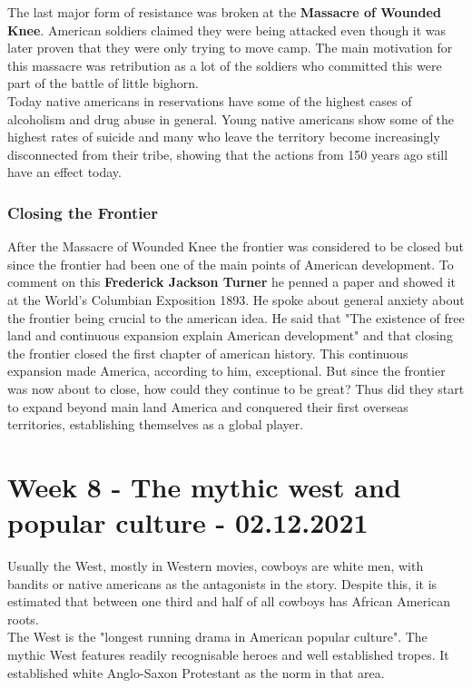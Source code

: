 \documentclass{article}
\begin{document}
	The last major form of resistance was broken at the \textbf{Massacre of Wounded Knee}. American soldiers claimed they were being attacked even though it was later proven that they were only trying to move camp. The main motivation for this massacre was retribution as a lot of the soldiers who committed this were part of the battle of little bighorn. \\
	Today native americans in reservations have some of the highest cases of alcoholism and drug abuse in general. Young native americans show some of the highest rates of suicide and many who leave the territory become increasingly disconnected from their tribe, showing that the actions from 150 years ago still have an effect today. \\
	\subsubsection{Closing the Frontier}
	After the Massacre of Wounded Knee the frontier was considered to be closed but since the frontier had been one of the main points of American development. To comment on this \textbf{Frederick Jackson Turner} he penned a paper and showed it at the World's Columbian Exposition 1893. He spoke about general anxiety about the frontier being crucial to the american idea. He said that "The existence of free land and continuous expansion explain American development" and that closing the frontier closed the first chapter of american history. This continuous expansion made America, according to him, exceptional. But since the frontier was now about to close, how could they continue to be great? Thus did they start to expand beyond main land America and conquered their first overseas territories, establishing themselves as a global player. \\

	\section{Week 8 - The mythic west and popular culture - 02.12.2021}

	Usually the West, mostly in Western movies, cowboys are white men, with bandits or native americans as the antagonists in the story. Despite this, it is estimated that between one third and half of all cowboys has African American roots. \\
	The West is the "longest running drama in American popular culture". The mythic West features readily recognisable heroes and well established tropes. It established white Anglo-Saxon Protestant as the norm in that area. \\
\end{document}
